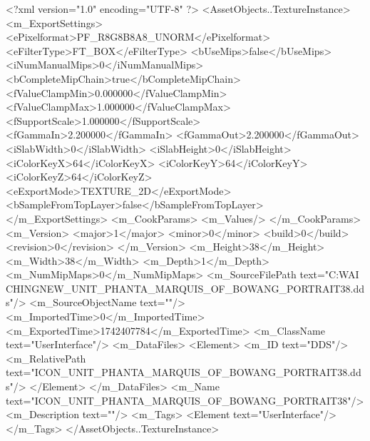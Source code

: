 <?xml version="1.0" encoding="UTF-8" ?>
<AssetObjects..TextureInstance>
	<m_ExportSettings>
		<ePixelformat>PF_R8G8B8A8_UNORM</ePixelformat>
		<eFilterType>FT_BOX</eFilterType>
		<bUseMips>false</bUseMips>
		<iNumManualMips>0</iNumManualMips>
		<bCompleteMipChain>true</bCompleteMipChain>
		<fValueClampMin>0.000000</fValueClampMin>
		<fValueClampMax>1.000000</fValueClampMax>
		<fSupportScale>1.000000</fSupportScale>
		<fGammaIn>2.200000</fGammaIn>
		<fGammaOut>2.200000</fGammaOut>
		<iSlabWidth>0</iSlabWidth>
		<iSlabHeight>0</iSlabHeight>
		<iColorKeyX>64</iColorKeyX>
		<iColorKeyY>64</iColorKeyY>
		<iColorKeyZ>64</iColorKeyZ>
		<eExportMode>TEXTURE_2D</eExportMode>
		<bSampleFromTopLayer>false</bSampleFromTopLayer>
	</m_ExportSettings>
	<m_CookParams>
		<m_Values/>
	</m_CookParams>
	<m_Version>
		<major>1</major>
		<minor>0</minor>
		<build>0</build>
		<revision>0</revision>
	</m_Version>
	<m_Height>38</m_Height>
	<m_Width>38</m_Width>
	<m_Depth>1</m_Depth>
	<m_NumMipMaps>0</m_NumMipMaps>
	<m_SourceFilePath text="C:\Users\YANG WAI CHING\Downloads\CIV\DDS NEW\ICON_UNIT_PHANTA_MARQUIS_OF_BOWANG_PORTRAIT38.dds"/>
	<m_SourceObjectName text=""/>
	<m_ImportedTime>0</m_ImportedTime>
	<m_ExportedTime>1742407784</m_ExportedTime>
	<m_ClassName text="UserInterface"/>
	<m_DataFiles>
		<Element>
			<m_ID text="DDS"/>
			<m_RelativePath text="ICON_UNIT_PHANTA_MARQUIS_OF_BOWANG_PORTRAIT38.dds"/>
		</Element>
	</m_DataFiles>
	<m_Name text="ICON_UNIT_PHANTA_MARQUIS_OF_BOWANG_PORTRAIT38"/>
	<m_Description text=""/>
	<m_Tags>
		<Element text="UserInterface"/>
	</m_Tags>
</AssetObjects..TextureInstance>

